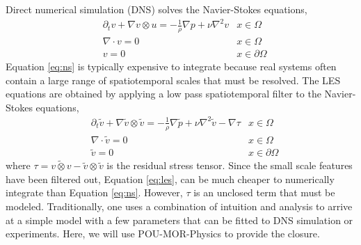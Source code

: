  Direct numerical simulation (DNS) solves the Navier-Stokes equations,
\begin{equation}\label{eq:ns}
\begin{aligned}
    &\partial_t v + \nabla {v} \otimes {u} = -\frac{1}{\rho} \nabla p + \nu \nabla^2 v & x \in \Omega\\
    &\nabla \cdot v = 0 & x \in \Omega \\
    &v = 0 & x \in \partial\Omega
\end{aligned}
\end{equation}
Equation \eqref{eq:ns} is typically expensive to integrate because real systems often contain a large range of spatiotemporal scales that must be resolved. The LES equations are obtained by applying a low pass spatiotemporal filter to the Navier-Stokes equations,
\begin{equation}\label{eq:les}
\begin{aligned}
    &\partial_t \tilde{v} + \nabla \tilde{v} \otimes \tilde{v} = -\frac{1}{\rho} \nabla \tilde{p} + \nu \nabla^2 \tilde{v} - \nabla \tau  & x \in \Omega \\
    &\nabla \cdot \tilde{v} = 0  & x \in \Omega \\
    &\tilde{v} = 0 & x \in \partial\Omega
\end{aligned}
\end{equation}
where $\tau = \widetilde{v \otimes v} - \tilde{v} \otimes \tilde{v}$ is the residual stress tensor. Since the small scale features have been filtered out, Equation \eqref{eq:les}, can be much cheaper to numerically integrate than Equation \eqref{eq:ns}. However, $\tau$ is an unclosed term that must be modeled. Traditionally, one uses a combination of intuition and analysis to arrive at a simple model with a few parameters that can be fitted to DNS simulation or experiments. Here, we will use POU-MOR-Physics to provide the closure.

